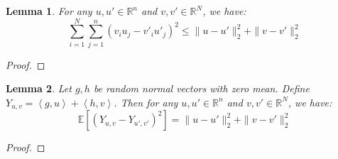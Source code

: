 \documentclass{article}
\newtheorem{lemma}{Lemma}[subsection]
\theoremstyle{remark}
\newcommand{\real}{\mathbb{R}}
\newcommand{\Exp}{\mathbb{E}}
\newcommand{\inner}[2]{\left\langle #1, #2 \right\rangle}
\begin{document}
\begin{lemma}
\label{lem:inner-to-norm}
For any \(u, u' \in \real^{n}\) and \(v, v' \in \real^{N}\), we have:
\begin{equation*}
\sum_{i=1}^{N}\sum_{j=1}^{n}(v_{i}u_{j} - v'_{i}u'_{j})^{2} \leq \|u - u'\|_{2}^{2} + \|v - v'\|_{2}^{2}
\end{equation*}
\end{lemma}
\begin{proof}

\end{proof}

\begin{lemma}
\label{lem:linear-random-vec}
Let \(g, h\) be random normal vectors with zero mean. Define \(Y_{u, v} = \inner{g}{u} + \inner{h}{v}\). Then for any \(u, u' \in \real^{n}\) and \(v, v' \in \real^{N}\), we have:
\begin{equation*}
\Exp\left[(Y_{u, v} - Y_{u', v'})^{2}\right] = \|u - u'\|_{2}^{2} + \|v - v'\|_{2}^{2}
\end{equation*}
\end{lemma}
\begin{proof}

\end{proof}
\end{document}
